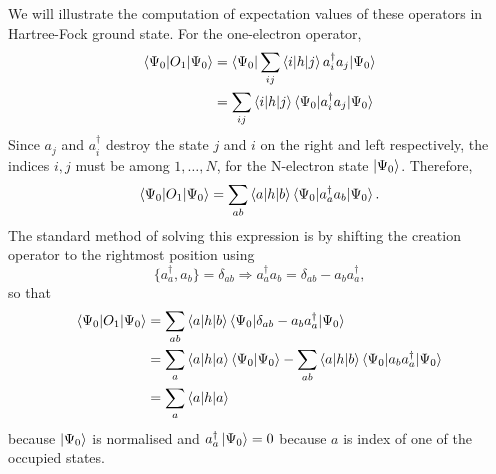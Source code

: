 We will illustrate the computation of expectation values of these operators in
Hartree-Fock ground state. For the one-electron operator,
\[
\begin{aligned}
\braket{\Psi_0|O_1|\Psi_0} &= 
    \braket{\Psi_0|\sum_{ij}\braket{i|h|j}a_i^\dagger a_j|\Psi_0} \\
 &= \sum_{ij}\braket{i|h|j} \braket{\Psi_0|a_i^\dagger a_j|\Psi_0} 
 \end{aligned}
\]
Since $a_j$ and $a_i^\dagger$ destroy the state $j$ and $i$ on the right and
left respectively, the indices $i, j$ must be among $1, \ldots, N$, for the
N-electron state $\ket{\Psi_0}$. Therefore,
\[
\braket{\Psi_0|O_1|\Psi_0} = 
\sum_{ab}\braket{a|h|b}\braket{\Psi_0|a_a^\dagger a_b|\Psi_0}.
\]
The standard method of solving this expression is by shifting the creation
operator to the rightmost position using
\[
\{a_a^\dagger, a_b\} = \delta_{ab} \Rightarrow a_a^\dagger a_b = \delta_{ab} -
a_b a_a^\dagger,
\]
so that
\begin{equation}\label{c2e135}
\begin{aligned}
\braket{\Psi_0|O_1|\Psi_0} &= 
\sum_{ab}\braket{a|h|b}\braket{\Psi_0|\delta_{ab} - a_ba_a^\dagger|\Psi_0}\\
 &= \sum_a\braket{a|h|a}\braket{\Psi_0|\Psi_0} - \sum_{ab}\braket{a|h|b}
    \braket{\Psi_0|a_b a_a^\dagger|\Psi_0} \\
 &= \sum_a\braket{a|h|a}
\end{aligned}
\end{equation}
because $\ket{\Psi_0}$ is normalised and $a_a^\dagger\ket{\Psi_0} = 0$ because
$a$ is index of one of the occupied states.

